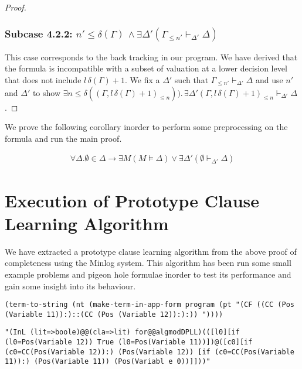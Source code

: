 \begin{mytheorem}
\begin{proof}
\subsubsection*{Subcase 4.2.2: $ n' \leq \delta(\Gamma) \, \wedge  \exists \Delta' ( \Gamma_{ \leq n'}  \vdash_{\Delta'} \Delta)$} 
This case corresponds to the back tracking in our program. We have derived that the formula is incompatible with a subset of valuation at a lower decision level that does not include $l \, \delta(\Gamma) + 1$. We fix a $\Delta'$ such that $\Gamma_{\leq n'} \vdash_{\Delta'} \Delta$ and use $n'$ and $\Delta'$ to show $\exists n \leq \delta((\Gamma, l \, \delta(\Gamma) + 1)_{\leq n})). \, \exists \Delta' (\Gamma, l \, \delta(\Gamma) + 1)_{\leq n} \vdash_{\Delta'} \Delta$.
\end{proof}
\end{mytheorem}
%
We prove the following corollary inorder to perform some preprocessing on the formula and run the main proof.
\begin{mycorollary}
\begin{align*}
\forall \Delta. \emptyset \in \Delta \to \exists M( M \models \Delta) \vee \exists \Delta'(\emptyset \vdash_{\Delta'} \Delta)
\end{align*}
\end{mycorollary}

\section{Execution of Prototype Clause Learning Algorithm}
We have extracted a prototype clause learning algorithm from the above proof of completeness using the Minlog system. This algorithm has been run some small example problems and pigeon hole formulae inorder to test its performance and gain some insight into its behaviour.




\begin{center}\texttt{(term-to-string (nt (make-term-in-app-form program (pt "(CF ((CC (Pos (Variable 11)):)::(CC (Pos (Variable 12)):):)) "))))}
\end{center}

\begin{center}
\texttt{"(InL (lit=>boole)@@(cla=>lit) for@@algmodDPLL)(([l0][if (l0=Pos(Variable 12)) True (l0=Pos(Variable 11))])@([c0][if (c0=CC(Pos(Variable 12)):) (Pos(Variable 12)) [if (c0=CC(Pos(Variable 11)):) (Pos(Variable 11)) (Pos(Variabl\
e 0))]]))"}                                                                      
\end{center}








